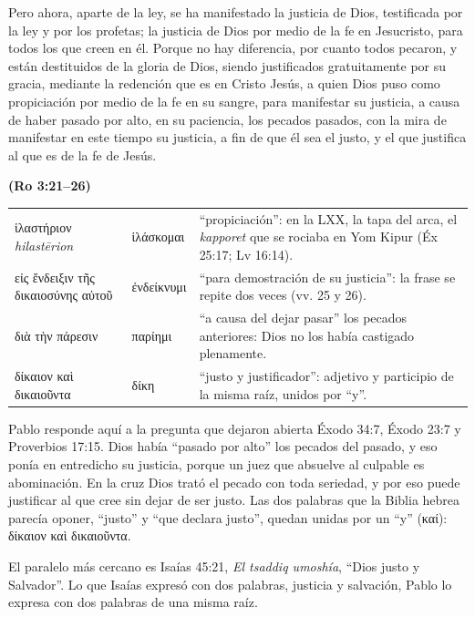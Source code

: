 \documentclass[11pt,letterpaper]{article}
\newcommand{\grc}[1]{\foreignlanguage{ancientgreek}{#1}}
\newcommand{\fuente}[1]{\par\hfill{\upshape\bfseries\small\textcolor{azul}{#1}}}
\begin{document}
\begin{cita}Pero ahora, aparte de la ley, se ha manifestado la justicia de Dios, testificada por la ley y por los profetas; la justicia de Dios por medio de la fe en Jesucristo, para todos los que creen en él. Porque no hay diferencia, por cuanto todos pecaron, y están destituidos de la gloria de Dios, siendo justificados gratuitamente por su gracia, mediante la redención que es en Cristo Jesús, a quien Dios puso como propiciación por medio de la fe en su sangre, para manifestar su justicia, a causa de haber pasado por alto, en su paciencia, los pecados pasados, con la mira de manifestar en este tiempo su justicia, a fin de que él sea el justo, y el que justifica al que es de la fe de Jesús.\fuente{(Ro 3:21--26)}\end{cita}

\begin{filologia}[Ro 3:25--26]
\begin{tabular}{@{}L{3.2cm}L{1.6cm}L{10cm}@{}}
\grc{ἱλαστήριον} \emph{hilastērion} & \grc{ἱλάσκομαι} & ``propiciación'': en la LXX, la tapa del arca, el \emph{kapporet} que se rociaba en Yom Kipur (Éx 25:17; Lv 16:14). \\[2pt]
\grc{εἰς ἔνδειξιν τῆς δικαιοσύνης αὐτοῦ} & \grc{ἐνδείκνυμι} & ``para demostración de su justicia'': la frase se repite dos veces (vv. 25 y 26). \\[2pt]
\grc{διὰ τὴν πάρεσιν} & \grc{παρίημι} & ``a causa del dejar pasar'' los pecados anteriores: Dios no los había castigado plenamente. \\[2pt]
\grc{δίκαιον καὶ δικαιοῦντα} & \grc{δίκη} & ``justo y justificador'': adjetivo y participio de la misma raíz, unidos por ``y''. \\
\end{tabular}
\end{filologia}

Pablo responde aquí a la pregunta que dejaron abierta Éxodo 34:7, Éxodo 23:7 y Proverbios 17:15. Dios había ``pasado por alto'' los pecados del pasado, y eso ponía en entredicho su justicia, porque un juez que absuelve al culpable es abominación. En la cruz Dios trató el pecado con toda seriedad, y por eso puede justificar al que cree sin dejar de ser justo. Las dos palabras que la Biblia hebrea parecía oponer, ``justo'' y ``que declara justo'', quedan unidas por un ``y'' (\grc{καί}): \grc{δίκαιον καὶ δικαιοῦντα}.

El paralelo más cercano es Isaías 45:21, \emph{El tsaddiq umoshía}, ``Dios justo y Salvador''. Lo que Isaías expresó con dos palabras, justicia y salvación, Pablo lo expresa con dos palabras de una misma raíz.
\end{document}
